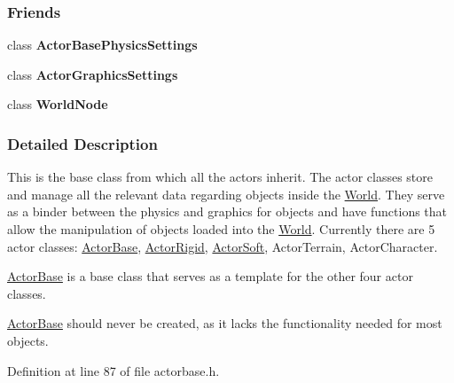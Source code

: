 \subsubsection*{Friends}
\begin{DoxyCompactItemize}
\item 
\hypertarget{classMezzanine_1_1ActorBase_ad56afa2bffce8b552583041f21297874}{
class {\bfseries ActorBasePhysicsSettings}}
\label{classMezzanine_1_1ActorBase_ad56afa2bffce8b552583041f21297874}

\item 
\hypertarget{classMezzanine_1_1ActorBase_a01f5bcaf4807085e756d9c03b3eb8d9d}{
class {\bfseries ActorGraphicsSettings}}
\label{classMezzanine_1_1ActorBase_a01f5bcaf4807085e756d9c03b3eb8d9d}

\item 
\hypertarget{classMezzanine_1_1ActorBase_a1cacd07efb11226da49a7c80569b18e8}{
class {\bfseries WorldNode}}
\label{classMezzanine_1_1ActorBase_a1cacd07efb11226da49a7c80569b18e8}

\end{DoxyCompactItemize}


\subsubsection{Detailed Description}
This is the base class from which all the actors inherit. The actor classes store and manage all the relevant data regarding objects inside the \hyperlink{classMezzanine_1_1World}{World}. They serve as a binder between the physics and graphics for objects and have functions that allow the manipulation of objects loaded into the \hyperlink{classMezzanine_1_1World}{World}. Currently there are 5 actor classes: \hyperlink{classMezzanine_1_1ActorBase}{ActorBase}, \hyperlink{classMezzanine_1_1ActorRigid}{ActorRigid}, \hyperlink{classMezzanine_1_1ActorSoft}{ActorSoft}, ActorTerrain, ActorCharacter. \par
 \hyperlink{classMezzanine_1_1ActorBase}{ActorBase} is a base class that serves as a template for the other four actor classes. \par
 \hyperlink{classMezzanine_1_1ActorBase}{ActorBase} should never be created, as it lacks the functionality needed for most objects. 

Definition at line 87 of file actorbase.h.



